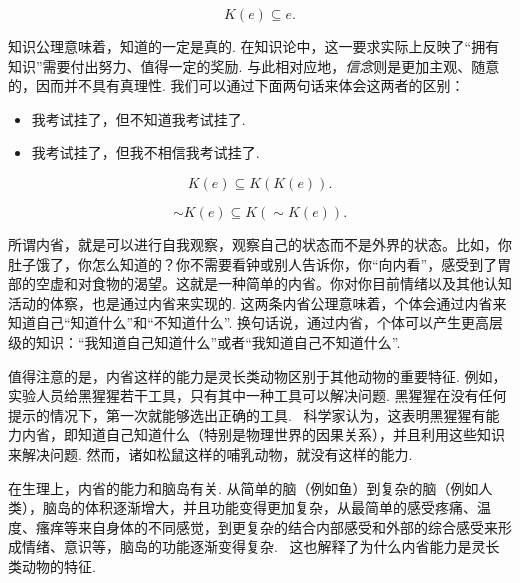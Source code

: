 \begin{proposition}
    \begin{equation}
        K(e)\subseteq e.\tag{K2}\label{eq:K2-knowledge}
    \end{equation}
\end{proposition}
知识公理意味着，知道的一定是真的. 在知识论中，这一要求实际上反映了“拥有知识”需要付出努力、值得一定的奖励. 与此相对应地，\textit{信念}则是更加主观、随意的，因而并不具有真理性. 我们可以通过下面两句话来体会这两者的区别：
    \begin{itemize}
        \item 我考试挂了，但不知道我考试挂了.
        \item 我考试挂了，但我不相信我考试挂了.
    \end{itemize}

\begin{proposition}[正内省公理]
    \begin{equation}
        K(e)\subseteq K(K(e)).\tag{K3}\label{eq:K3-positive-introspection}
    \end{equation}
\end{proposition}

\begin{proposition}[负内省公理]
    \begin{equation}
        \sim K(e)\subseteq K(\sim K(e)).\tag{K4}\label{eq:K4-negative-introspection}
    \end{equation}
\end{proposition}

所谓内省，就是可以进行自我观察，观察自己的状态而不是外界的状态。比如，你肚子饿了，你怎么知道的？你不需要看钟或别人告诉你，你“向内看”，感受到了胃部的空虚和对食物的渴望。这就是一种简单的内省。你对你目前情绪以及其他认知活动的体察，也是通过内省来实现的. 这两条内省公理意味着，个体会通过内省来知道自己“知道什么”和“不知道什么”. 换句话说，通过内省，个体可以产生更高层级的知识：“我知道自己知道什么”或者“我知道自己不知道什么”. 

值得注意的是，内省这样的能力是灵长类动物区别于其他动物的重要特征. 例如，实验人员给黑猩猩若干工具，只有其中一种工具可以解决问题. 黑猩猩在没有任何提示的情况下，第一次就能够选出正确的工具.~\cite{hanusChimpanzeeProblemsolvingContrasting2011} 科学家认为，这表明黑猩猩有能力内省，即知道自己知道什么（特别是物理世界的因果关系），并且利用这些知识来解决问题. 然而，诸如松鼠这样的哺乳动物，就没有这样的能力.~\cite{tomaselloEvolutionAgency2022}

在生理上，内省的能力和脑岛有关. 从简单的脑（例如鱼）到复杂的脑（例如人类），脑岛的体积逐渐增大，并且功能变得更加复杂，从最简单的感受疼痛、温度、瘙痒等来自身体的不同感觉，到更复杂的结合内部感受和外部的综合感受来形成情绪、意识等，脑岛的功能逐渐变得复杂.~\cite{craigSignificanceInsulaEvolution2011} 这也解释了为什么内省能力是灵长类动物的特征.

